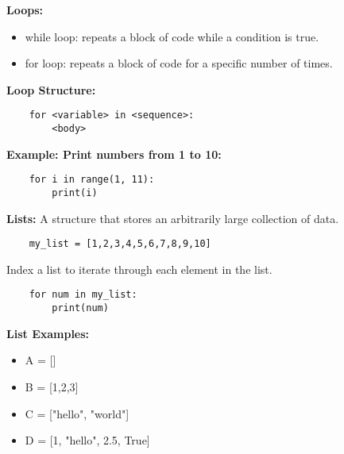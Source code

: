 \documentclass[11pt]{article}
\begin{document}
\textbf{Loops:}
\begin{itemize}
    \item while loop: repeats a block of code while a condition is true.
    \item for loop: repeats a block of code for a specific number of times.
\end{itemize}
\textbf{Loop Structure:}
\begin{verbatim}
    for <variable> in <sequence>:
        <body>
\end{verbatim}
\textbf{Example: Print numbers from 1 to 10:}
\begin{verbatim}
    for i in range(1, 11):
        print(i)
\end{verbatim}
\textbf{Lists:} A structure that stores an arbitrarily large collection of data.
\begin{verbatim}
    my_list = [1,2,3,4,5,6,7,8,9,10]
\end{verbatim}
Index a list to iterate through each element in the list. 
\begin{verbatim}
    for num in my_list:
        print(num)
\end{verbatim}
\textbf{List Examples:}
\begin{itemize}
    \item A = []
    \item B = [1,2,3]
    \item C = ["hello", "world"]
    \item D = [1, "hello", 2.5, True]
\end{itemize}
\end{document}
